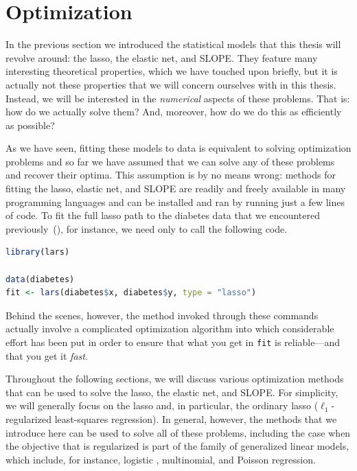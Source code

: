 \section{Optimization}\label{sec:optimization}

In the previous section we introduced the statistical models that this thesis will revolve around: the lasso, the elastic net, and SLOPE. They feature many interesting theoretical properties, which we have touched upon briefly, but it is actually not these properties that we will concern ourselves with in this thesis. Instead, we will be interested in the \emph{numerical} aspects of these problems. That is: how do we actually solve them? And, moreover, how do we do this as efficiently as possible?

As we have seen, fitting these models to data is equivalent to solving optimization problems and so far we have assumed that we can solve any of these problems and recover their optima. This assumption is by no means wrong: methods for fitting the lasso, elastic net, and SLOPE are readily and freely available in many programming languages and can be installed and ran by running just a few lines of code. To fit the full lasso path to the diabetes data that we encountered previously~(), for instance, we need only to call the following  code.

\begin{lstlisting}[language=R]
library(lars)

data(diabetes)
fit <- lars(diabetes$x, diabetes$y, type = "lasso")
\end{lstlisting}

Behind the scenes, however, the method invoked through these commands actually involve a complicated optimization algorithm into which considerable effort has been put in order to ensure that what you get in \texttt{fit} is reliable---and that you get it \emph{fast}.

Throughout the following sections, we will discuss various optimization methods that can be used to solve the lasso, the elastic net, and SLOPE. For simplicity, we will generally focus on the lasso and, in particular, the ordinary lasso (\(\ell_1\)-regularized least-squares regression). In general, however, the methods that we introduce here can be used to solve all of these problems, including the case when the objective that is regularized is part of the family of generalized linear models, which include, for instance, logistic , multinomial, and Poisson regression.

